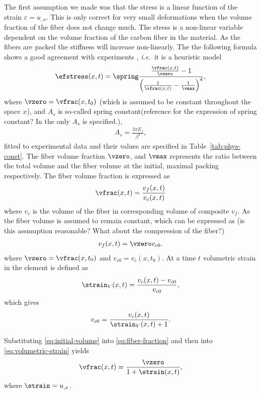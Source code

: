 \documentclass[twoside,a4paper,12pt]{article}
\newcommand{\tabref}[1]{Table~\ref{#1}}
\newcommand{\ie}{{\it i.e.\ }}
\newcommand{\note}[1]{{\color{red}(#1)}}
\newcommand{\note}[1]{}
\begin{document}
The first assumption we made was that the stress is a linear function
of the strain $\varepsilon = u_{,x}$. This is only correct for very
small deformations when the volume fraction of the fiber does not
change much.  The stress is a non-linear variable dependent on the
volume fraction of the carbon fiber in the material. As the fibers are
packed the stiffness will increase non-linearly. The the following
formula shows a good agreement with experiments \citet{Gutowski1987},
\ie it is a heuristic model
% 
\begin{align}
  \efstress(x,t) = \spring
  \frac{\frac{\vfrac(x,t)}{\vzero} -1}{\left(\frac{1}{\vfrac(x,t)} -\frac{1}{\vmax}\right)^4}, \label{eq:stress-nonlin}
\end{align}
%
where $\vzero = \vfrac(x,t_0)$ \note{which is assumed to be constant
  throughout the space $x$}, and $A_s$ is so-called spring
constant\note{reference for the expression of spring constant? In the
  \citet{Gutowski1987} only $A_s$ is specified.},
%
\begin{align}
  A_s = \frac{3\pi E_f}{\beta^4},
\end{align}
%
fitted to experimental data and their values are specified in
\tabref{tab:phys-const}.
%
The fiber volume fraction $\vzero$, and $\vmax$ represents the ratio
between the total volume and the fiber volume at the initial, maximal
packing respectively. The fiber volume fraction is expressed as
\begin{align}
  \vfrac(x,t) = \frac{v_f(x,t)}{v_c(x,t)}
\end{align}
%
where $v_c$ is the volume of the fiber in corresponding volume of
composite $v_f$. As the fiber volume is assumed to remain constant,
which can be expressed as
%
\note{is this assmuption reasonable? What about the compression of the fiber?}
%
\begin{align}
  v_f(x,t) = \vzero v_{c0}. \label{eq:fiber-fraction}
\end{align}
where $\vzero = \vfrac(x,t_0)$ and $v_{c0} = v_c(x,t_0)$.
%
At a time $t$ volumetric strain in the element is defined as
\begin{align}
  \strain_V(x,t) = \frac{v_c(x,t) - v_{c0}}{v_{c0}}, \label{eq:volumetric-strain}
\end{align}
which gives
%
\begin{align}
{v_{c0}}= \frac{v_c(x,t) }{\strain_V(x,t) + 1}. \label{eq:initial-volume}
\end{align}

Substituting \eqref{eq:initial-volume} into \eqref{eq:fiber-fraction}
and then into \eqref{eq:volumetric-strain} yields
%
\begin{align}
  \vfrac(x,t) = \frac{\vzero}{1+\strain(x,t)}, \label{eq:fiber-volume}
\end{align}
%
where $\strain =  u_{,x}$.
\end{document}
